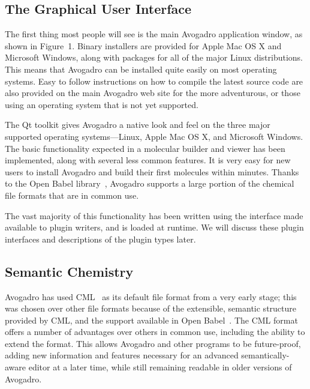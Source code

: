 \documentclass[10pt]{bmc_article}
\newenvironment{bmcformat}{\begin{raggedright}
  \baselineskip20pt\sloppy\setboolean{publ}{false}}{\end{raggedright}
  \baselineskip20pt\sloppy}
\begin{document}
\begin{bmcformat}
\section*{The Graphical User Interface}

The first thing most people will see is the main Avogadro application
window, as shown in Figure~1. Binary installers are provided
for Apple Mac OS X and Microsoft Windows, along with packages for all of the
major Linux distributions. This means that Avogadro can be installed quite
easily on most operating systems. Easy to follow instructions on how to compile
the latest source code are also provided on the main Avogadro web
site\cite{CompileWindows,CompileLinux} for the more adventurous, or those using
an operating system that is not yet supported.

The Qt toolkit gives Avogadro a native look and feel on the three major
supported operating systems---Linux, Apple Mac OS X, and Microsoft Windows. The
basic
functionality expected in a molecular builder and viewer has been implemented,
along with several less common features. It is very easy for new users to
install Avogadro and build their
first molecules within minutes. Thanks to the Open Babel library~\cite{OpenBabel}, Avogadro
supports a large portion of the chemical file formats that are in
common use.

The vast majority of this functionality has been written using the
interface made available to plugin writers, and is loaded at
runtime. We will discuss these plugin interfaces and descriptions of
the plugin types later.

\subsection*{Semantic Chemistry}

Avogadro has used CML~\cite{CML2011a, CML2011b} as its default file format from
a very early stage; this was chosen over other file formats because of the
extensible, semantic structure provided by CML, and the support available in
Open Babel~\cite{OpenBabel}. The CML format offers a number of advantages over
others in common use, including the ability to extend the format. This allows
Avogadro and other programs to be future-proof, adding new information and
features necessary for an advanced semantically-aware editor at a later time,
while still remaining readable in older versions of Avogadro.


\end{bmcformat}
\end{document}
